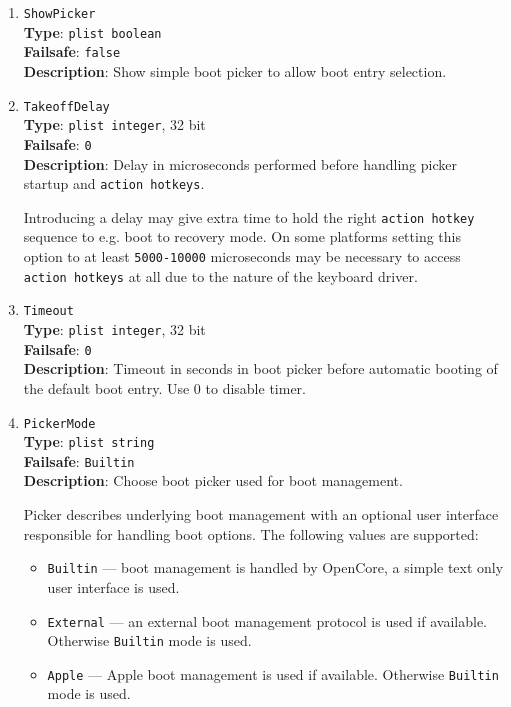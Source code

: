 \documentclass[]{article}
\providecommand{\tightlist}{%
  \setlength{\itemsep}{0pt}\setlength{\parskip}{0pt}}
\begin{document}
\begin{enumerate}
\item
  \texttt{ShowPicker}\\
  \textbf{Type}: \texttt{plist\ boolean}\\
  \textbf{Failsafe}: \texttt{false}\\
  \textbf{Description}: Show simple boot picker to allow boot entry selection.

\item
  \texttt{TakeoffDelay}\\
  \textbf{Type}: \texttt{plist\ integer}, 32 bit\\
  \textbf{Failsafe}: \texttt{0}\\
  \textbf{Description}: Delay in microseconds performed before handling
  picker startup and \texttt{action hotkeys}.

  Introducing a delay may give extra time to hold the right \texttt{action hotkey}
  sequence to e.g. boot to recovery mode. On some platforms setting this option to
  at least \texttt{5000-10000} microseconds may be necessary to access
  \texttt{action hotkeys} at all due to the nature of the keyboard driver.

\item
  \texttt{Timeout}\\
  \textbf{Type}: \texttt{plist\ integer}, 32 bit\\
  \textbf{Failsafe}: \texttt{0}\\
  \textbf{Description}: Timeout in seconds in boot picker before
  automatic booting of the default boot entry. Use 0 to disable timer.

\item
  \texttt{PickerMode}\\
  \textbf{Type}: \texttt{plist\ string}\\
  \textbf{Failsafe}: \texttt{Builtin}\\
  \textbf{Description}: Choose boot picker used for boot management.

  Picker describes underlying boot management with an optional user interface
  responsible for handling boot options. The following values are supported:

  \begin{itemize}
  \tightlist
  \item \texttt{Builtin} --- boot management is handled by OpenCore, a simple
  text only user interface is used.
  \item \texttt{External} --- an external boot management protocol is used
  if available. Otherwise \texttt{Builtin} mode is used.
  \item \texttt{Apple} --- Apple boot management is used if available.
  Otherwise \texttt{Builtin} mode is used.
  \end{itemize}


\end{enumerate}
\end{document}
